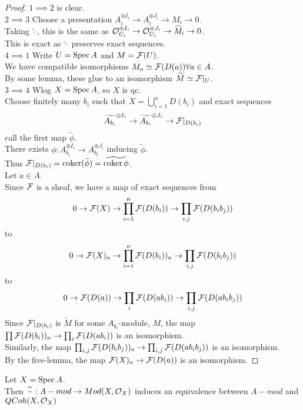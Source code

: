 \documentclass[../main.tex]{subfiles}
\begin{document}
\begin{proof}
$1\implies 2$ is clear.\\
$2\implies 3$ Choose a presentation $A_i^{\oplus I_i}\to A_i^{\oplus J_i}\to M_i \to 0$.\\
Taking $\widetilde{\cdot}$, this is the same as $\mathcal{O}_{U_i}^{\oplus I_i}\to \mathcal{O}_{U_i} ^{\oplus J_i}\to \widetilde { M}_i \to 0$.\\
This is exact as $\widetilde{\cdot}$ preserves exact sequences.\\
$4\implies 1$ Write $U= \operatorname{Spec} A$ and $M = \mathcal{F}( U) $.\\
We have compatible isomorphisms $M_a\simeq \mathcal{F}( D( a) ) \forall a\in A$.\\
By some lemma, these glue to an isomorphism $\widetilde M \simeq \mathcal{F}|_U$.\\
$3\implies 4$ Wlog $X=\operatorname{Spec} A$, so $X$ is qc.\\
Choose finitely many $b_i$ such that $X= \bigcup_{i=1}^{n}D( b_i) $ and exact sequences 
\[ 
	\widetilde{A_{b_i} } ^{\oplus I_i} \to \widetilde{A_{b_i} } ^{\oplus J_i} \to \mathcal{F}|_{D( b_i) } 
\]
call the first map $\tilde\phi$.\\
There exists $\phi: A_{b_i}^{\oplus I_i}\to A_{b_i} ^{\oplus J_i}$ inducing $\tilde \phi$.\\
Thus $\mathcal{F}|_{D( b_i) } = \operatorname{coker} ( \tilde\phi) = \widetilde{\operatorname{coker}\phi}$.\\
Let $a\in A$.\\
Since $\mathcal{F}$ is a sheaf, we have a map of exact sequences from
\[ 
0 \to \mathcal{F}( X) \to \prod_{i=1}^{n}\mathcal{F}( D( b_i) ) \to \prod_{i,j} \mathcal{F}( D( b_ib_j) ) 
\]
to
\[ 
0 \to \mathcal{F}( X)_a \to \prod_{i=1}^{n}\mathcal{F}( D( b_i) )_a \to \prod_{i,j} \mathcal{F}( D( b_ib_j) ) 
\]
to
\[ 
0 \to \mathcal{F}( D( a) ) \to \prod_{i} \mathcal{F}( D( ab_i) ) \to \prod_{i,j}  \mathcal{F}( D( ab_ib_j ) ) 
\]
Since $\mathcal{F}|_{D( b_i) } $ is $\widetilde M$ for some $A_{b_i}$-module, $M$, the map $\prod \mathcal{F}( D( b_i) )_a\to \prod_i \mathcal{F}( D( ab_i) ) $ is an isomorphism.\\
Similarly, the map $\prod_{i,j} \mathcal{F}( D( b_ib_j) )_a\to \prod_{i,j } \mathcal{F}( D( ab_ib_j) )  $ is an isomorphism.\\
By the five-lemma, the map $\mathcal{F}( X)_a\to \mathcal{F}( D( a) ) $ is an isomorphism.
\end{proof}
\begin{crly}
Let $X= \operatorname{Spec} A$.\\
Then $\widetilde{-}: A-mod \to Mod( X,\mathcal{O}_X) $ induces an equivalence between $A-mod$ and $QCoh( X,\mathcal{O}_X) $ 
\end{crly}
\end{document}
